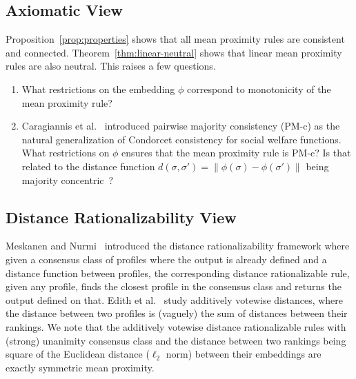 \documentclass[prodmode,acmec]{ec-acmsmall}
\begin{document}

\subsection{Axiomatic View}
Proposition~\ref{prop:properties} shows that all mean proximity rules are consistent and connected. Theorem~\ref{thm:linear-neutral} shows that linear mean proximity rules are also neutral. This raises a few questions.

\begin{enumerate}
\item What restrictions on the embedding $\phi$ correspond to monotonicity of the mean proximity rule?
\item Caragiannis et al.~\cite{CPS13} introduced pairwise majority consistency (PM-c) as the natural generalization of Condorcet consistency for social welfare functions. What restrictions on $\phi$ ensures that the mean proximity rule is PM-c? Is that related to the distance function $d(\sigma,\sigma') = \|\phi(\sigma)-\phi(\sigma')\|$ being majority concentric~\cite{CPS13}?
\end{enumerate}


\subsection{Distance Rationalizability View}
Meskanen and Nurmi~\cite{MN08} introduced the distance rationalizability framework where given a consensus class of profiles where the output is already defined and a distance function between profiles, the corresponding distance rationalizable rule, given any profile, finds the closest profile in the consensus class and returns the output defined on that. Edith et al.~\cite{EFS10} study additively votewise distances, where the distance between two profiles is (vaguely) the sum of distances between their rankings. We note that the additively votewise distance rationalizable rules with (strong) unanimity consensus class and the distance between two rankings being square of the Euclidean distance ($\ell_2$ norm) between their embeddings are exactly symmetric mean proximity. 
\end{document}
